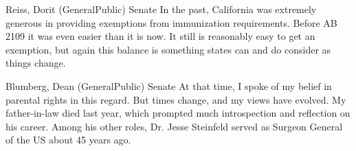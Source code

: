 \begin{result}{7.46386998412798}{Reiss, Dorit (GeneralPublic) Senate}
In the past, California was extremely generous in providing exemptions from immunization requirements. Before AB 2109 it was even easier than it is now. It still is reasonably easy to get an exemption, but again this balance is something states can and do consider as things change.
\end{result}

\begin{result}{7.024375537439714}{Blumberg, Dean (GeneralPublic) Senate}
At that time, I spoke of my belief in parental rights in this regard. But times change, and my views have evolved. My father-in-law died last year, which prompted much introspection and reflection on his career. Among his other roles, Dr. Jesse Steinfeld served as Surgeon General of the US about 45 years ago.
\end{result}


